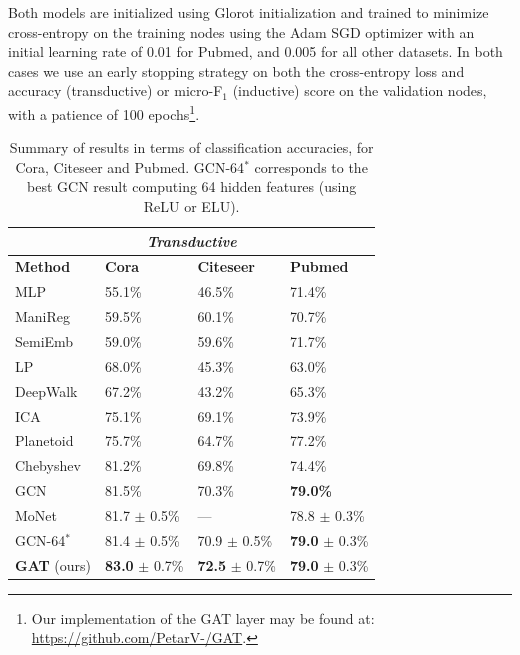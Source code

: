 \documentclass{article} %
\begin{document}
Both models are initialized using Glorot initialization \citep{glorot2010understanding} and trained to minimize cross-entropy on the training nodes using the Adam SGD optimizer \citep{kingma2014adam} with an initial learning rate of 0.01 for Pubmed, and 0.005 for all other datasets. In both cases we use an early stopping strategy on both the cross-entropy loss and accuracy (transductive) or micro-F$_1$ (inductive) score on the validation nodes, with a patience of 100 epochs\footnote{Our implementation of the GAT layer may be found at: \url{https://github.com/PetarV-/GAT}.}.

\begin{table}[ht!]
\caption{Summary of results in terms of classification accuracies, for Cora, Citeseer and Pubmed. GCN-64$^*$ corresponds to the best GCN result computing 64 hidden features (using ReLU or ELU).}
\label{transtable}
\begin{center}
\begin{tabular}{l l l l}
\multicolumn{4}{c}{\textbf{\emph{Transductive}}}\\
\toprule
{\bf Method} & {\bf Cora} & {\bf Citeseer} & {\bf Pubmed}\\ \midrule
MLP & 55.1\% & 46.5\% & 71.4\% \\
ManiReg \citep{belkin2006manifold} & 59.5\% & 60.1\% & 70.7\%\\
SemiEmb \citep{weston2012deep} & 59.0\% & 59.6\% & 71.7\%\\
LP \citep{zhu2003semi} & 68.0\% & 45.3\% & 63.0\%\\
DeepWalk \citep{perozzi2014deepwalk} & 67.2\% & 43.2\% & 65.3\%\\
ICA \citep{lu2003link} & 75.1\% & 69.1\% & 73.9\%\\
Planetoid \citep{yang2016revisiting} & 75.7\% & 64.7\% & 77.2\%\\
Chebyshev \citep{defferrard2016convolutional} & 81.2\% & 69.8\% & 74.4\%\\
GCN \citep{kipf2016semi} & 81.5\% & 70.3\% & {\bf 79.0\%}\\
MoNet \citep{monti2016geometric} & 81.7 $\pm$ 0.5\% & --- & 78.8 $\pm$ 0.3\%\\ \midrule
GCN-64$^*$ & 81.4 $\pm$ 0.5\% & 70.9 $\pm$ 0.5\% & {\bf 79.0} $\pm$ 0.3\%\\
{\bf GAT} (ours) & {\bf 83.0} $\pm$ 0.7\% & {\bf 72.5} $\pm$ 0.7\% & {\bf 79.0} $\pm$ 0.3\%\\\bottomrule%
\end{tabular}
\end{center}
\end{table}
\end{document}
